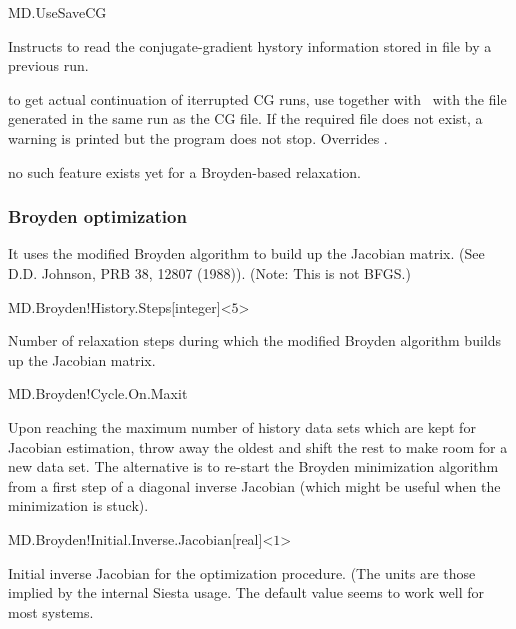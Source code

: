 \begin{fdflogicalF}{MD.UseSaveCG}

  Instructs to read the conjugate-gradient hystory information stored
  in file  by a previous run.

  \note to get actual continuation of iterrupted CG runs, use
  together with  \fdftrue\ with the 
  file generated in the same run as the CG file.  If the required file
  does not exist, a warning is printed but the program does not
  stop. Overrides .

  \note no such feature exists yet for a Broyden-based relaxation.

\end{fdflogicalF}

\subsubsection{Broyden optimization}

It uses the modified Broyden algorithm to
build up the Jacobian matrix. (See D.D. Johnson, PRB 38, 12807
(1988)). (Note: This is not BFGS.)

\begin{fdfentry}{MD.Broyden!History.Steps}[integer]<$5$>

  Number of relaxation steps during which the modified Broyden
  algorithm builds up the Jacobian matrix.

\end{fdfentry}

\begin{fdflogicalT}{MD.Broyden!Cycle.On.Maxit}

  Upon reaching the maximum number of history data sets which are kept
  for Jacobian estimation, throw away the oldest and shift the rest to
  make room for a new data set. The alternative is to re-start the
  Broyden minimization algorithm from a first step of a diagonal
  inverse Jacobian (which might be useful when the minimization is
  stuck).

\end{fdflogicalT}

\begin{fdfentry}{MD.Broyden!Initial.Inverse.Jacobian}[real]<$1$>

  Initial inverse Jacobian for the optimization procedure. (The units
  are those implied by the internal Siesta usage. The default value
  seems to work well for most systems.

\end{fdfentry}



